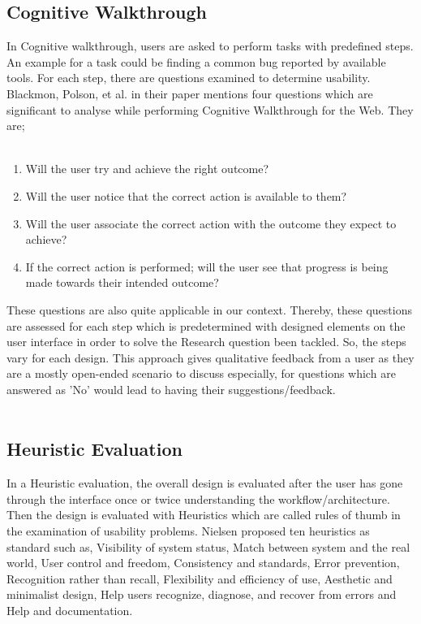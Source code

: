 \subsection{Cognitive Walkthrough}

In Cognitive walkthrough, users are asked to perform tasks with predefined steps. An example for a task could be finding a common bug reported by available tools. For each step, there are questions examined to determine usability. Blackmon, Polson, et al. in their paper \cite{blackmon2002cognitive} mentions four questions which are significant to analyse while performing Cognitive Walkthrough for the Web. They are;  \\ \\

\begin{enumerate}
	\item Will the user try and achieve the right outcome?	
	\item Will the user notice that the correct action is available to them?
	\item Will the user associate the correct action with the outcome they expect to achieve?
	\item If the correct action is performed; will the user see that progress is being made towards their intended outcome?
\end{enumerate}

These questions are also quite applicable in our context. Thereby, these questions are assessed for each step which is predetermined with designed elements on the user interface in order to solve the Research question been tackled. So, the steps vary for each design. This approach gives qualitative feedback from a user as they are a mostly open-ended scenario to discuss especially, for questions which are answered as 'No' would lead to having their suggestions/feedback. \\ \\

\subsection{Heuristic Evaluation}

In a Heuristic evaluation, the overall design is evaluated after the user has gone through the interface once or twice understanding the workflow/architecture. Then the design is evaluated with Heuristics which are called rules of thumb in the examination of usability problems. Nielsen proposed ten heuristics as standard such as, Visibility of system status, Match between system and the real world, User control and freedom, Consistency and standards, Error prevention, Recognition rather than recall, Flexibility and efficiency of use, Aesthetic and minimalist design, Help users recognize, diagnose, and recover from errors and Help and documentation. \\ \\

